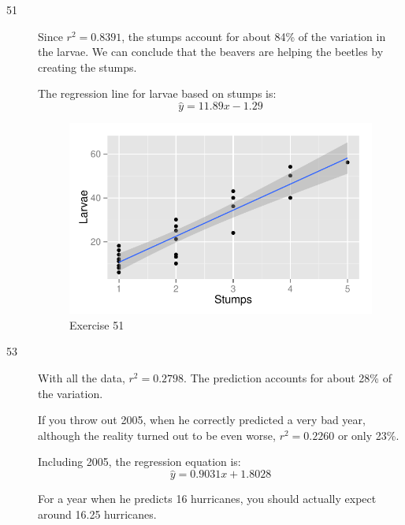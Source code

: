 \documentclass[letterpaper, landscape]{exam}
\begin{document}
\begin{description}
      \item[51]
        Since $r^2 = 0.8391$, the stumps account for about 84\% of the variation
        in the larvae.  We can conclude that the beavers are helping the beetles
        by creating the stumps.

        The regression line for larvae based on stumps is:
        \[
          \hat{y} = 11.89 x - 1.29
        \]

        \begin{figure}[H]
          \centering
          \includegraphics[scale = 0.9]{figures/ex51.pdf}
          \caption{Exercise 51}
        \end{figure}

      \pagebreak

      \item[53]
        With all the data, $r^2 = 0.2798$.  The prediction accounts for about
        28\% of the variation.  
        
        If you throw out 2005, when he correctly predicted a very bad year,
        although the reality turned out to be even worse, $r^2 = 0.2260$ or only
        23\%.

        Including 2005, the regression equation is:
        \[
          \hat{y} = 0.9031 x + 1.8028
        \]

        For a year when he predicts 16 hurricanes, you should actually expect
        around 16.25 hurricanes.


\end{description}
\end{document}
